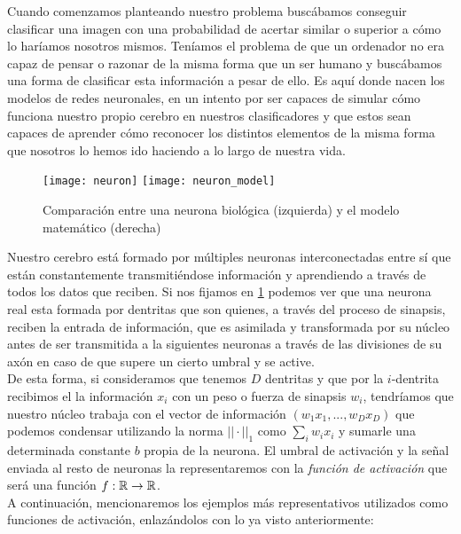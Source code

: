 Cuando comenzamos planteando nuestro problema buscábamos conseguir clasificar una imagen con una probabilidad de acertar similar o superior a cómo lo haríamos nosotros mismos. Teníamos el problema de que un ordenador no era capaz de pensar o razonar de la misma forma que un ser humano y buscábamos una forma de clasificar esta información a pesar de ello. Es aquí donde nacen los modelos de redes neuronales, en un intento por ser capaces de simular cómo funciona nuestro propio cerebro en nuestros clasificadores y que estos sean capaces de aprender cómo reconocer los distintos elementos de la misma forma que nosotros lo hemos ido haciendo a lo largo de nuestra vida.\\

\begin{figure}[htpb]
  \centering
  \texttt{[image: neuron]}
  \vrule
  \texttt{[image: neuron\_model]}
  \caption{Comparación entre una neurona biológica (izquierda) y el modelo matemático (derecha) }
  \label{fig:neurona}
\end{figure}

Nuestro cerebro está formado por múltiples neuronas interconectadas entre sí que están constantemente transmitiéndose información y aprendiendo a través de todos los datos que reciben. Si nos fijamos en \ref{fig:neurona} podemos ver que una neurona real esta formada por dentritas que son quienes, a través del proceso de sinapsis, reciben la entrada de información, que es asimilada y transformada por su núcleo antes de ser transmitida a la siguientes neuronas a través de las divisiones de su axón en caso de que supere un cierto umbral y se active.\\

De esta forma, si consideramos que tenemos $D$ dentritas y que por la $i$-dentrita recibimos el la información $x_i$ con un peso o fuerza de sinapsis $w_i$, tendríamos que nuestro núcleo trabaja con el vector de información $(w_1 x_1,...,w_D x_D)$ que podemos condensar utilizando la norma $||\cdot ||_1$ como $\sum_i w_i x_i $ y sumarle una determinada constante $b$ propia de la neurona. El umbral de activación y la señal enviada al resto de neuronas la representaremos con la \emph{función de activación}\label{def:ActivationFunction} que será una función $f: \mathbb{R} \to \mathbb{R}$. \\

A continuación, mencionaremos los ejemplos más representativos utilizados como funciones de activación, enlazándolos con lo ya visto anteriormente:

